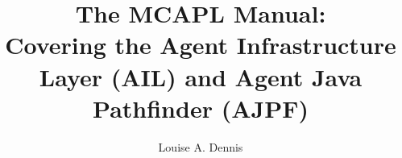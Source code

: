 \documentclass[a4]{book}
\author{Louise A. Dennis}
\title{The MCAPL Manual: \\
Covering the Agent Infrastructure Layer (AIL) and Agent Java Pathfinder (AJPF)}
\begin{document}
\maketitle

\tableofcontents

\SetJava










% 
% 


\printindex
\end{document}
